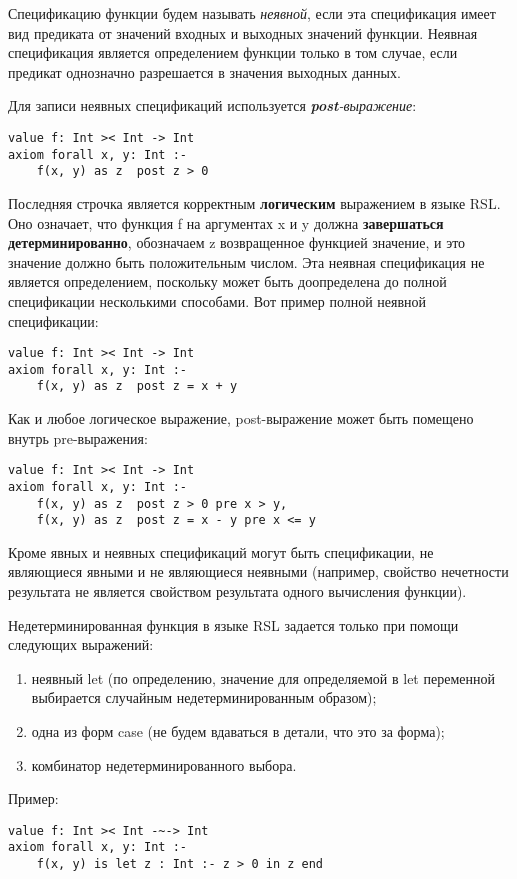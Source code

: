 Спецификацию функции будем называть \emph{неявной}, если эта спецификация имеет вид предиката от значений входных и выходных значений функции. Неявная спецификация является определением функции только в том случае, если предикат однозначно разрешается в значения выходных данных.

Для записи неявных спецификаций используется \emph{\textbf{post}-выражение}:
\begin{lstlisting}
value f: Int >< Int -> Int
axiom forall x, y: Int :-
    f(x, y) as z  post z > 0
\end{lstlisting}
Последняя строчка является корректным \textbf{логическим} выражением в языке RSL. Оно означает, что функция f на аргументах x и y должна \textbf{завершаться детерминированно}, обозначаем z возвращенное функцией значение, и это значение должно быть положительным числом. Эта неявная спецификация не является определением, поскольку может быть доопределена до полной спецификации несколькими способами. Вот пример полной неявной спецификации:
\begin{lstlisting}
value f: Int >< Int -> Int
axiom forall x, y: Int :-
    f(x, y) as z  post z = x + y
\end{lstlisting}
Как и любое логическое выражение, post-выражение может быть помещено внутрь pre-выражения:
\begin{lstlisting}
value f: Int >< Int -> Int
axiom forall x, y: Int :-
    f(x, y) as z  post z > 0 pre x > y,
    f(x, y) as z  post z = x - y pre x <= y
\end{lstlisting}

Кроме явных и неявных спецификаций могут быть спецификации, не являющиеся явными и не являющиеся неявными (например, свойство нечетности результата не является свойством результата одного вычисления функции).


Недетерминированная функция в языке RSL задается только при помощи следующих выражений:
\begin{enumerate}
  \item неявный let (по определению, значение для определяемой в let переменной выбирается случайным недетерминированным образом);
  \item одна из форм case (не будем вдаваться в детали, что это за форма);
  \item комбинатор недетерминированного выбора.
\end{enumerate}

Пример:
\begin{lstlisting}
value f: Int >< Int -~-> Int
axiom forall x, y: Int :-
    f(x, y) is let z : Int :- z > 0 in z end
\end{lstlisting}

